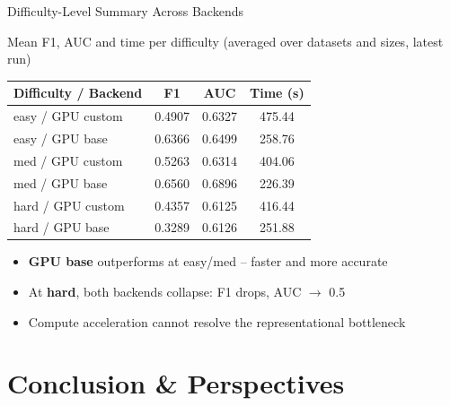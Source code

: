 \documentclass[10pt, aspectratio=169]{beamer}
\begin{document}
\begin{frame}{Difficulty-Level Summary Across Backends}
    \begin{center}
    {\small Mean F1, AUC and time per difficulty (averaged over datasets and sizes, latest run)}
    \end{center}
    \vspace{-0.15cm}
    \begin{center}
    \small
    \begin{tabular}{lccc}
        \toprule
        \textbf{Difficulty / Backend} & \textbf{F1} & \textbf{AUC} & \textbf{Time (s)} \\
        \midrule
        easy / GPU custom & 0.4907 & 0.6327 & 475.44 \\
        easy / GPU base   & 0.6366 & 0.6499 & 258.76 \\
        med  / GPU custom & 0.5263 & 0.6314 & 404.06 \\
        med  / GPU base   & 0.6560 & 0.6896 & 226.39 \\
        hard / GPU custom & 0.4357 & 0.6125 & 416.44 \\
        hard / GPU base   & 0.3289 & 0.6126 & 251.88 \\
        \bottomrule
    \end{tabular}
    \end{center}
    \vspace{0.2cm}
    \begin{itemize}
        \item \textbf{GPU base} outperforms at easy/med -- faster and more accurate
        \item At \textbf{hard}, both backends collapse: F1 drops, AUC $\to$ 0.5
        \item Compute acceleration cannot resolve the representational bottleneck
    \end{itemize}
\end{frame}

\section{Conclusion \& Perspectives}
\end{document}

